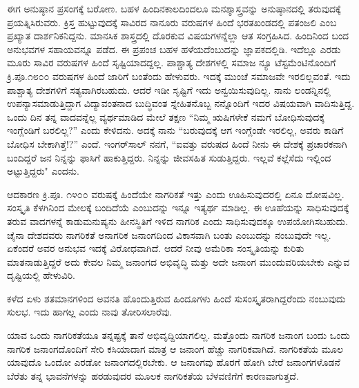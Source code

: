 ಈಗ ಅನುಷ್ಠಾನ ಪ್ರಸಂಗಕ್ಕೆ ಬರೋಣ. ಬಹಳ ಹಿಂದಿನಕಾಲದಿಂದಲೂ ಮನಶ್ಶಾಸ್ತ್ರವನ್ನು ಅನುಷ್ಠಾನದಲ್ಲಿ ತರುವುದಕ್ಕೆ ಪ್ರಯತ್ನಿಸಿರುವರು. ಕ್ರಿಸ್ತ ಹುಟ್ಟುವುದಕ್ಕೆ ಸಾವಿರದ ನಾನೂರು ವರುಷಗಳ ಹಿಂದೆ ಭರತಖಂಡದಲ್ಲಿ ಪತಂಜಲಿ ಎಂಬ ಪ್ರಖ್ಯಾತ ದಾರ್ಶನಿಕನಿದ್ದನು. ಮಾನಸಿಕ ಶಾಸ್ತ್ರದಲ್ಲಿ ದೊರಕುವ ವಿಷಯಗಳನ್ನೆಲ್ಲಾ ಆತ ಸಂಗ್ರಹಿಸಿದ. ಹಿಂದಿನಿಂದ ಬಂದ ಅನುಭವಗಳ ಸಹಾಯವನ್ನೂ ಪಡೆದ. ಈ ಪ್ರಪಂಚ ಬಹಳ ಹಳೆಯದೆಂಬುದನ್ನು ಜ್ಞಾಪಕದಲ್ಲಿಡಿ. ಇದೆಲ್ಲೂ ಎರಡು ಮೂರು ಸಾವಿರ ವರುಷಗಳ ಹಿಂದೆ ಸೃಷ್ಟಿಯಾದದ್ದಲ್ಲ. ಪಾಶ್ಚಾತ್ಯ ದೇಶಗಳಲ್ಲಿ ಸಮಾಜ ನ್ಯೂ ಟೆಸ್ಟಮೆಂಟಿನೊಂದಿಗೆ ಕ್ರಿ.ಪೂ.೧೮೦೦ ವರುಷಗಳ ಹಿಂದೆ ಜಾರಿಗೆ ಬಂತೆಂದು ಹೇಳುವರು. ಇದಕ್ಕೆ ಮುಂಚೆ ಸಮಾಜವೇ ಇರಲಿಲ್ಲವಂತೆ. ಇದು ಪಾಶ್ಚಾತ್ಯ ದೇಶಗಳಿಗೆ ಸತ್ಯವಾಗಿರಬಹುದು. ಆದರೆ ಇಡೀ ಸೃಷ್ಟಿಗೆ ಇದು ಅನ್ವಯಿಸುವುದಿಲ್ಲ. ನಾನು ಲಂಡನ್ನಿನಲ್ಲಿ ಉಪನ್ಯಾಸ\break ಮಾಡುತ್ತಿದ್ದಾಗ ವಿದ್ಯಾವಂತನಾದ ಬುದ್ಧಿವಂತ ಸ್ನೇಹಿತನೊಬ್ಬ ನನ್ನೊಂದಿಗೆ ಇದರ ವಿಷಯವಾಗಿ ವಾದಿಸುತ್ತಿದ್ದ. ಒಂದು ದಿನ ತನ್ನ ವಾದವನ್ನೆಲ್ಲ ವ್ಯರ್ಥಮಾಡಿದ ಮೇಲೆ ತಕ್ಷಣ “ನಿಮ್ಮ ಋಷಿಗಳೇಕೆ ನಮಗೆ ಬೋಧಿಸುವುದಕ್ಕೆ ಇಂಗ್ಲೆಂಡಿಗೆ ಬರಲಿಲ್ಲ?” ಎಂದು ಕೇಳಿದನು. ಅದಕ್ಕೆ ನಾನು “ಬರುವುದಕ್ಕೆ ಆಗ ಇಂಗ್ಲೆಂಡೇ ಇರಲಿಲ್ಲ, ಅವರು ಕಾಡಿಗೆ ಬೋಧಿಸ ಬೇಕಾಗಿತ್ತೆ!?” ಎಂದೆ. ಇಂಗರ್‌ಸಾಲ್ ನನಗೆ, “ಐವತ್ತು ವರುಷದ ಹಿಂದೆ ನೀನು ಈ ದೇಶಕ್ಕೆ ಪ್ರಚಾರಕನಾಗಿ ಬಂದಿದ್ದರೆ ಜನ ನಿನ್ನನ್ನು ಫಾಸಿಗೆ ಹಾಕುತ್ತಿದ್ದರು. ನಿನ್ನನ್ನು ಜೀವಸಹಿತ ಸುಡುತ್ತಿದ್ದರು. ಇಲ್ಲವೆ ಕಲ್ಲೆಸೆದು ಇಲ್ಲಿಂದ ಅಟ್ಟುತ್ತಿದ್ದರು" ಎಂದನು.

ಆದಕಾರಣ ಕ್ರಿ.ಪೂ. ೧೪೦೦ ವರುಷಕ್ಕೆ ಹಿಂದೆಯೇ ನಾಗರಿಕತೆ ಇತ್ತು ಎಂದು ಊಹಿಸುವುದರಲ್ಲಿ ಏನೂ ದೋಷವಿಲ್ಲ. ಸಂಸ್ಕೃತಿ ಕೆಳಗಿನಿಂದ ಮೇಲಕ್ಕೆ ಬಂದಿದೆಯೆ ಎಂಬುದನ್ನು ಇನ್ನೂ ಇತ್ಯರ್ಥ ಮಾಡಿಲ್ಲ. ಈ ಊಹೆಯನ್ನು ಸಾಧಿಸುವುದಕ್ಕೆ ತರುವ ವಾದಗಳನ್ನೆ ಕಾಡುಮನುಷ್ಯನು ಹೀನಸ್ಥಿತಿಗೆ ಇಳಿದ ನಾಗರಿಕ ಎಂದು ಸಾಧಿಸುವುದಕ್ಕೂ ಉಪಯೋಗಿಸಬಹುದು. ಚೈನಾ ದೇಶದವರು ನಾಗರಿಕತೆ ಅನಾಗರಿಕ ಜನಾಂಗದಿಂದ ವಿಕಾಸವಾಗಿ ಬಂತು ಎಂಬುದನ್ನು ನಂಬುವುದೇ ಇಲ್ಲ. ಏಕೆಂದರೆ ಅವರ ಅನುಭವ ಇದಕ್ಕೆ ವಿರೋಧವಾಗಿದೆ. ಆದರೆ ನೀವು ಅಮೆರಿಕಾ ಸಂಸ್ಕೃತಿಯನ್ನು ಕುರಿತು ಮಾತನಾಡುತ್ತಿದ್ದರೆ ಅದು ಕೇವಲ ನಿಮ್ಮ ಜನಾಂಗದ ಅಭಿವೃದ್ಧಿ ಮತ್ತು ಅದೇ ಜನಾಂಗ ಮುಂದುವರಿಯಬೇಕು ಎನ್ನುವ ದೃಷ್ಟಿಯಲ್ಲಿ ಹೇಳುವಿರಿ.

ಕಳೆದ ಏಳು ಶತಮಾನಗಳಿಂದ ಅವನತಿ ಹೊಂದುತ್ತಿರುವ ಹಿಂದೂಗಳು ಹಿಂದೆ ಸುಸಂಸ್ಕೃತರಾಗಿದ್ದರೆಂದು ನಂಬುವುದು ಸುಲಭ. ಇದು ಹಾಗಲ್ಲ ಎಂದು ನಾವು ತೋರಿಸಲಾರೆವು.

ಯಾವ ಒಂದು ನಾಗರಿಕತೆಯೂ ತನ್ನಷ್ಟಕ್ಕೆ ತಾನೆ ಅಭಿವೃದ್ದಿಯಾಗಲಿಲ್ಲ. ಮತ್ತೊಂದು ನಾಗರಿಕ ಜನಾಂಗ ಬಂದು ಒಂದು ನಾಗರಿಕ ಜನಾಂಗದೊಂದಿಗೆ ಸೇರಿ ಕಸಿಯಾದಾಗ ಮಾತ್ರ ಆ ಜನಾಂಗ ಹೆಚ್ಚು ನಾಗರಿಕವಾಗಿದೆ. ನಾಗರಿಕತೆಯ ಮೂಲ ಯಾವುದೊ ಒಂದೋ ಎರಡೋ ಜನಾಂಗದಲ್ಲಿರಬೇಕು. ಆ ಜನಾಂಗವು ಹೊರಗೆ ಹೋಗಿ ಬೇರೆ ಜನಾಂಗಗಳೊಡನೆ ಬೆರೆತು ತನ್ನ ಭಾವನೆಗಳನ್ನು ಹರಡುವುದರ ಮೂಲಕ ನಾಗರಿಕತೆಯ ಬೆಳವಣಿಗೆಗೆ ಕಾರಣವಾಗುತ್ತದೆ.

